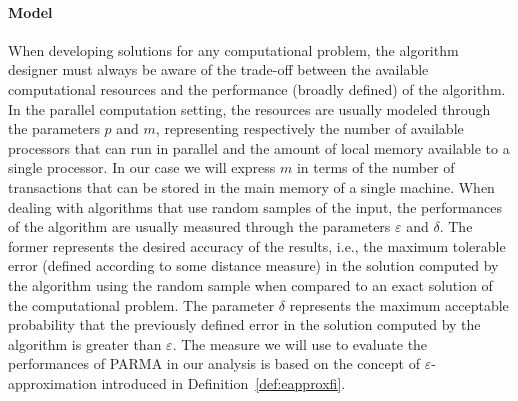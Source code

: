 \paragraph*{Model}When developing solutions for any computational problem,
the algorithm designer must always be aware of the trade-off between the available
computational resources and the performance (broadly defined) of the algorithm.
In the parallel computation setting, the resources are usually modeled through
the parameters $p$ and $m$, representing respectively the number of available
processors that can run in parallel and the amount of local memory available to
a single processor. In our case we will express $m$ in terms of the number of
transactions that can be stored in the main memory of a single machine.
When dealing with algorithms that use random samples of the input, the
performances of the algorithm are usually measured through the parameters
$\varepsilon$ and $\delta$. The former represents the desired accuracy of the
results, i.e., the maximum tolerable error (defined according to some distance
measure) in the solution computed by the algorithm using the random sample
when compared to an exact solution of the computational problem. The parameter
$\delta$ represents the maximum acceptable probability that the previously
defined error in the solution computed by the algorithm is greater than
$\varepsilon$. The measure we will use to evaluate the performances of PARMA in
our analysis is based on the concept of $\varepsilon$-approximation introduced in
Definition~\ref{def:eapproxfi}.

